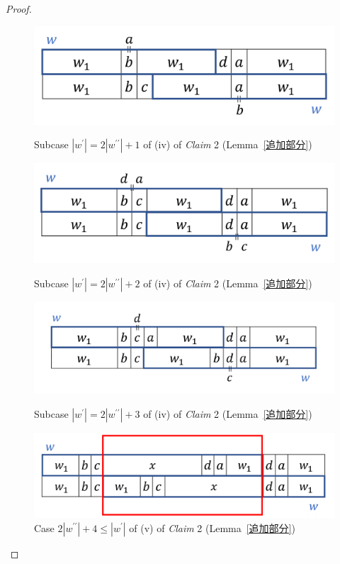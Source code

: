 \begin{proof}
\begin{figure}[t]
  \begin{center}
    \includegraphics[scale=0.35]{figs/w=2w_1+1.png}
    \caption{Subcase $|w^{\prime}| = 2|w^{\prime\prime}| + 1$ of (iv) of \textit{Claim} 2 (Lemma~\ref{追加部分})}\label{追加部分13}
    \includegraphics[scale=0.35]{figs/w=2w_1+2.png}
    \caption{Subcase $|w^{\prime}| = 2|w^{\prime\prime}| + 2$ of (iv) of \textit{Claim} 2 (Lemma~\ref{追加部分})}\label{追加部分12}
    \includegraphics[scale=0.35]{figs/w=2w_1+3.png}
    \caption{Subcase $|w^{\prime}| = 2|w^{\prime\prime}| + 3$ of (iv) of \textit{Claim} 2 (Lemma~\ref{追加部分})}\label{追加部分11}
  \end{center}
\end{figure}

\begin{figure}[t]
  \begin{center}
    \includegraphics[scale=0.35]{figs/2w1+5.png}
    \caption{Case $2|w^{\prime\prime}| + 4 \leq |w^{\prime}|$ of (v) of \textit{Claim} 2 (Lemma~\ref{追加部分})}\label{2w1+5}
  \end{center}
\end{figure}
    

\end{proof}
